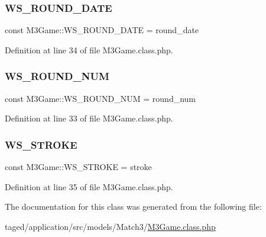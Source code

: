 \subsubsection{\texorpdfstring{W\+S\+\_\+\+R\+O\+U\+N\+D\+\_\+\+D\+A\+TE}{WS\_ROUND\_DATE}}
{\footnotesize\ttfamily const M3\+Game\+::\+W\+S\+\_\+\+R\+O\+U\+N\+D\+\_\+\+D\+A\+TE = \textquotesingle{}round\+\_\+date\textquotesingle{}}



Definition at line 34 of file M3\+Game.\+class.\+php.

\mbox{\label{class_m3_game_afbe61beb457d2a2fb735a84d76542b4a}} 
\subsubsection{\texorpdfstring{W\+S\+\_\+\+R\+O\+U\+N\+D\+\_\+\+N\+UM}{WS\_ROUND\_NUM}}
{\footnotesize\ttfamily const M3\+Game\+::\+W\+S\+\_\+\+R\+O\+U\+N\+D\+\_\+\+N\+UM = \textquotesingle{}round\+\_\+num\textquotesingle{}}



Definition at line 33 of file M3\+Game.\+class.\+php.

\mbox{\label{class_m3_game_a3eb5e640caded0a0df1b62d108fffe10}} 
\subsubsection{\texorpdfstring{W\+S\+\_\+\+S\+T\+R\+O\+KE}{WS\_STROKE}}
{\footnotesize\ttfamily const M3\+Game\+::\+W\+S\+\_\+\+S\+T\+R\+O\+KE = \textquotesingle{}stroke\textquotesingle{}}



Definition at line 35 of file M3\+Game.\+class.\+php.



The documentation for this class was generated from the following file\+:\begin{DoxyCompactItemize}
\item 
taged/application/src/models/\+Match3/\hyperlink{_m3_game_8class_8php}{M3\+Game.\+class.\+php}\end{DoxyCompactItemize}
